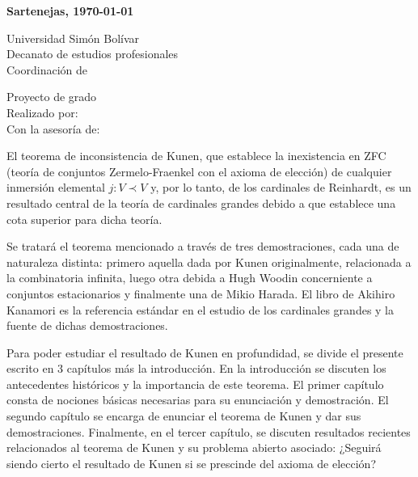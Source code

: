     \textbf{Sartenejas, \today}\par
\egroup
\fi
\ifresumen\newpage
\PrintUsbLogo
    {
        Universidad Simón Bolívar\\
        Decanato de estudios profesionales\\
        Coordinación de \coord
    }

\begin{center}
    \begin{minipage}{14cm}
        \centering
        \UppercaseBold
            {
                \MainTitle
            }
    \end{minipage}

    \vspace{.5cm}

    \UpperCase
        {
            Proyecto de grado
        } \\
    Realizado por: \autor \\
    Con la asesoría de: \tutor \\[.5cm]

\end{center}

El teorema de inconsistencia de Kunen, que establece la inexistencia en
ZFC (teoría de conjuntos Zermelo-Fraenkel con el axioma de elección)
de cualquier inmersión elemental $j\colon V\prec V$ y, por lo tanto, de los cardinales
de Reinhardt, es un resultado central de la teoría de cardinales grandes
debido a que establece una cota superior para dicha teoría.

Se tratará el teorema mencionado a través de tres demostraciones, cada una de naturaleza
distinta: primero aquella dada por Kunen originalmente, relacionada a la combinatoria infinita,
luego otra debida a Hugh Woodin concerniente a conjuntos estacionarios y finalmente una de
Mikio Harada. El libro de Akihiro Kanamori \autocite{cohen_independence_1964} es la referencia
estándar en el estudio de los cardinales grandes y la fuente de dichas demostraciones.

Para poder estudiar el resultado de Kunen en profundidad,
se divide el presente escrito en 3 capítulos más la introducción.
En la introducción se discuten los antecedentes históricos y la importancia
de este teorema.
El primer capítulo consta de nociones básicas necesarias para su enunciación y demostración.
El segundo capítulo se encarga de enunciar el teorema de Kunen y dar sus demostraciones.
Finalmente, en el tercer capítulo, se discuten resultados recientes relacionados al teorema de Kunen
y su problema abierto asociado:
¿Seguirá siendo cierto el resultado de Kunen si se prescinde del axioma de elección?

